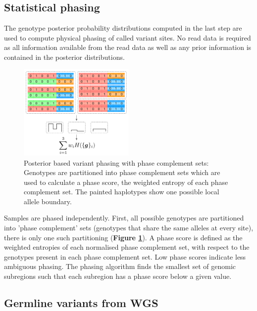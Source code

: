 \documentclass[notitlepage, twocolumn]{article}
\begin{document}
\subsection*{Statistical phasing}

The genotype posterior probability distributions computed in the last step are used to compute physical phasing of called variant sites. No read data is required as all information available from the read data as well as any prior information is contained in the posterior distributions.

\begin{figure}[h]
\centering
\includegraphics[width=0.5\textwidth]{figures/phasing}
\caption{Posterior based variant phasing with phase complement sets: Genotypes are partitioned into phase complement sets which are used to calculate a phase score, the weighted entropy of each phase complement set. The painted haplotypes show one possible local allele boundary.}
\label{fig:phasing}
\vspace{-1.5em}
\end{figure}

Samples are phased independently. First, all possible genotypes are partitioned into  'phase complement' sets (genotypes that share the same alleles at every site), there is only one such partitioning (\textbf{Figure \ref{fig:phasing}}). A phase score is defined as the weighted entropies of each normalised phase complement set, with respect to the genotypes present in each phase complement set. Low phase scores indicate less ambiguous phasing. The phasing algorithm finds the smallest set of genomic subregions such that each subregion has a phase score below a given value. 

\subsection*{Germline variants from WGS}
\end{document}
